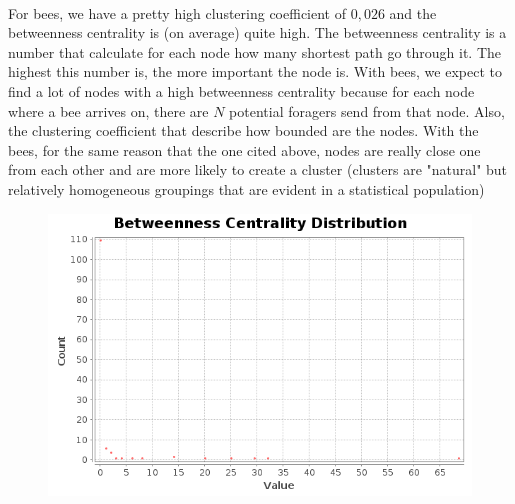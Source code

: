 \documentclass{article}
\begin{document}
		\paragraph{}
			For bees, we have a pretty high clustering coefficient of $0,026$ and the betweenness centrality is (on average) quite high.
			The betweenness centrality is a number that calculate for each node how many shortest path go through it.
			The highest this number is, the more important the node is.
			With bees, we expect to find a lot of nodes with a high betweenness centrality because for each node where a bee arrives on,
			there are $N$ potential foragers send from that node.
			Also, the clustering coefficient that describe how bounded are the nodes.
			With the bees, for the same reason that the one cited above,
			nodes are really close one from each other and are more likely to create a cluster
			(clusters are "natural" but relatively homogeneous groupings that are evident in a statistical population)
		\begin{figure}[!h]
			\includegraphics[width=1\textwidth]{dh_betweenness_centrality_bees}
		\end{figure}
\end{document}
